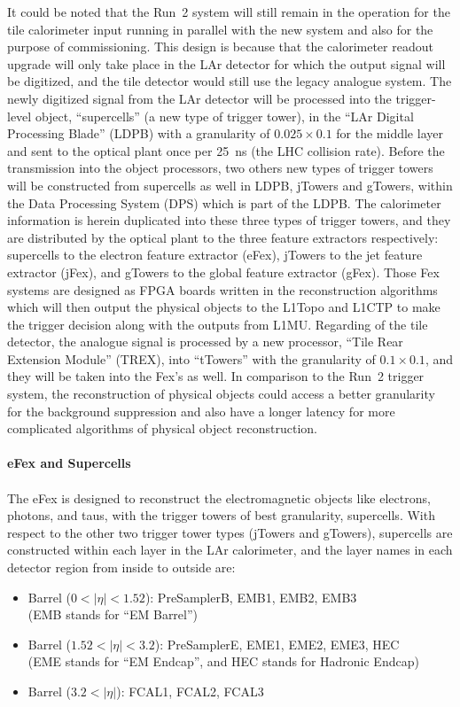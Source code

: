 It could be noted that the Run~2 system will still remain in the operation for the tile calorimeter input running in parallel with the new system and also for the purpose of commissioning. This design is because that the calorimeter readout upgrade will only take place in the LAr detector for which the output signal will be digitized, and the tile detector would still use the legacy analogue system. The newly digitized signal from the LAr detector will be processed into the trigger-level object, ``supercells'' (a new type of trigger tower), in the ``LAr Digital Processing Blade'' (LDPB) with a granularity of $0.025\times0.1$ for the middle layer and sent to the optical plant once per 25~ns (the LHC collision rate). Before the transmission into the object processors, two others new types of trigger towers will be constructed from supercells as well in LDPB, jTowers and gTowers, within the Data Processing System (DPS) which is part of the LDPB. The calorimeter information is herein duplicated into these three types of trigger towers, and they are distributed by the optical plant to the three feature extractors respectively: supercells to the electron feature extractor (eFex), jTowers to the jet feature extractor (jFex), and gTowers to the global feature extractor (gFex). Those Fex systems are designed as FPGA boards written in the reconstruction algorithms which will then output the physical objects to the L1Topo and L1CTP to make the trigger decision along with the outputs from L1MU. Regarding of the tile detector, the analogue signal is processed by a new processor, ``Tile Rear Extension Module'' (TREX), into ``tTowers'' with the granularity of $0.1\times0.1$, and they will be taken into the Fex's as well. In comparison to the Run~2 trigger system, the reconstruction of physical objects could access a better granularity for the background suppression and also have a longer latency for more complicated algorithms of physical object reconstruction.   
\\
\\{\bf eFex and Supercells}
\\
\\The eFex is designed to reconstruct the electromagnetic objects like electrons, photons, and taus, with the trigger towers of best granularity, supercells. With respect to the other two trigger tower types (jTowers and gTowers), supercells are constructed within each layer in the LAr calorimeter, and the layer names in each detector region from inside to outside are:
\begin{itemize}
	\item Barrel ($0<|\eta|<1.52$): PreSamplerB, EMB1, EMB2, EMB3 \\ (EMB stands for ``EM Barrel'')
	\item Barrel ($1.52<|\eta|<3.2$): PreSamplerE, EME1, EME2, EME3, HEC \\ (EME stands for ``EM Endcap'', and HEC stands for Hadronic Endcap)
	\item Barrel ($3.2<|\eta|$): FCAL1, FCAL2, FCAL3
\end{itemize}
